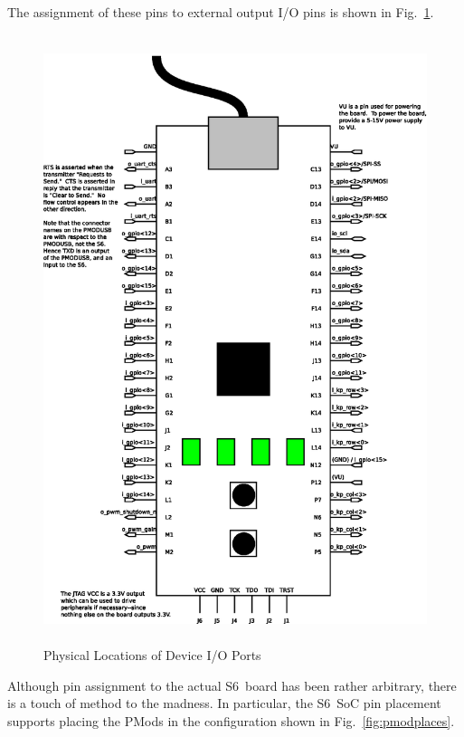 \documentclass{gqtekspec}
\begin{document}
The assignment of these pins to external output I/O pins is shown in
Fig.~\ref{fig:physicalio}.
\begin{figure}
\begin{center}
\includegraphics[height=7in]{../gfx/pinout.eps}
\caption{Physical Locations of Device I/O Ports}\label{fig:physicalio}
\end{center}\end{figure}
Although pin assignment to the actual S6~board has been rather arbitrary, there
is a touch of method to the madness.  In particular, the S6~SoC pin placement
supports placing the PMods in the configuration shown in
Fig.~\ref{fig:pmodplaces}.
\end{document}
